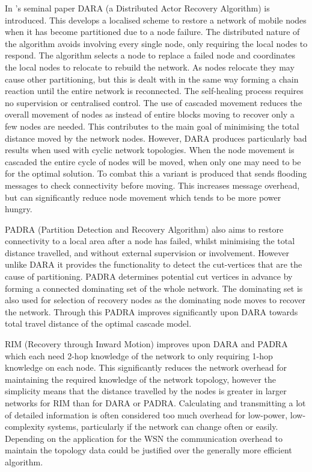 \documentclass[authoryearcitations]{UoYCSproject}
\begin{document}
In \citet{Abbasi2007}'s seminal paper DARA (a Distributed Actor Recovery Algorithm) is introduced. This develops a localised scheme to restore a network of mobile nodes when it has become partitioned due to a node failure. The distributed nature of the algorithm avoids involving every single node, only requiring the local nodes to respond. The algorithm selects a node to replace a failed node and coordinates the local nodes to relocate to rebuild the network. As nodes relocate they may cause other partitioning, but this is dealt with in the same way forming a chain reaction until the entire network is reconnected. The self-healing process requires no supervision or centralised control. The use of cascaded movement reduces the overall movement of nodes as instead of entire blocks moving to recover only a few nodes are needed. This contributes to the main goal of minimising the total distance moved by the network nodes.
However, DARA produces particularly bad results when used with cyclic network topologies. When the node movement is cascaded the entire cycle of nodes will be moved, when only one may need to be for the optimal solution. To combat this a variant is produced that sends flooding messages to check connectivity before moving. This increases message overhead, but can significantly reduce node movement which tends to be more power hungry.

PADRA (Partition Detection and Recovery Algorithm) \citep{Akkaya2008} also aims to restore connectivity to a local area after a node has failed, whilst minimising the total distance travelled, and without external supervision or involvement. However unlike DARA it provides the functionality to detect the cut-vertices that are the cause of partitioning. PADRA determines potential cut vertices in advance by forming a connected dominating set of the whole network. The dominating set is also used for selection of recovery nodes as the dominating node moves to recover the network. Through this PADRA improves significantly upon DARA towards total travel distance of the optimal cascade model.

RIM (Recovery through Inward Motion) \citep{Younis2010} improves upon DARA and PADRA which each need 2-hop knowledge of the network to only requiring 1-hop knowledge on each node. This significantly reduces the network overhead for maintaining the required knowledge of the network topology, however the simplicity means that the distance travelled by the nodes is greater in larger networks for RIM than for DARA or PADRA. Calculating and transmitting a lot of detailed information is often considered too much overhead for low-power, low-complexity systems, particularly if the network can change often or easily. Depending on the application for the WSN the communication overhead to maintain the topology data could be justified over the generally more efficient algorithm.
\end{document}
